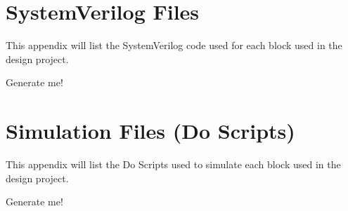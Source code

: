 \documentclass[a4paper]{article}
\begin{document}
\clearpage



\appendix
\section{SystemVerilog Files}
This appendix will list the SystemVerilog code used for each block used in the design project.

Generate me!

\clearpage




\section{Simulation Files (Do Scripts)}
This appendix will list the Do Scripts used to simulate each block used in the design project.

Generate me!
\end{document}
